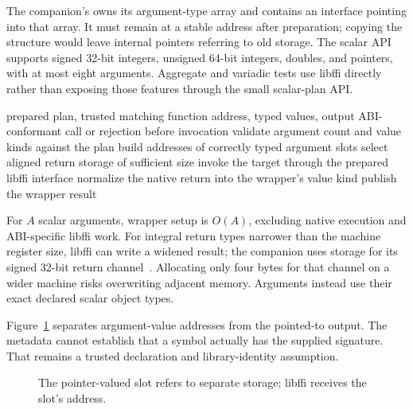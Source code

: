 The companion's  owns its argument-type array and contains an interface pointing into that array.
It must remain at a stable address after preparation; copying the structure would leave internal pointers referring to old storage.
The scalar API supports signed 32-bit integers, unsigned 64-bit integers, doubles, and pointers, with at most eight arguments.
Aggregate and variadic tests use libffi directly rather than exposing those features through the small scalar-plan API.

\begin{algorithm}[htbp]
\caption{Invoke a known native target through an address-stable prepared plan.}
\label{alg:ch70-call}
\begin{pseudocode}
\Require prepared plan, trusted matching function address, typed values, output
\Ensure ABI-conformant call or rejection before invocation
\State validate argument count and value kinds against the plan
\State build addresses of correctly typed argument slots
\State select aligned return storage of sufficient size
\State invoke the target through the prepared libffi interface
\State normalize the native return into the wrapper's value kind
\State publish the wrapper result
\end{pseudocode}
\end{algorithm}

For $A$ scalar arguments, wrapper setup is $O(A)$, excluding native execution and ABI-specific libffi work.
For integral return types narrower than the machine register size, libffi can write a widened result; the companion uses  storage for its signed 32-bit return channel~\cite{libffi-2026-manual}.
Allocating only four bytes for that channel on a wider machine risks overwriting adjacent memory.
Arguments instead use their exact declared scalar object types.

Figure~\ref{fig:ch70-indirection} separates argument-value addresses from the pointed-to output.
The metadata cannot establish that a symbol actually has the supplied signature.
That remains a trusted declaration and library-identity assumption.

\begin{figure}[htbp]
\centering
{}
\caption{The pointer-valued slot refers to separate storage; libffi receives the slot's address.}
\label{fig:ch70-indirection}
\end{figure}

